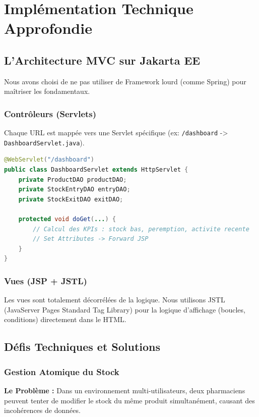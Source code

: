 \documentclass[12pt, a4paper]{report}
\begin{document}
\chapter{Implémentation Technique Approfondie}

\section{L'Architecture MVC sur Jakarta EE}
Nous avons choisi de ne pas utiliser de Framework lourd (comme Spring) pour maîtriser les fondamentaux.

\subsection{Contrôleurs (Servlets)}
Chaque URL est mappée vers une Servlet spécifique (ex: \texttt{/dashboard} -> \texttt{DashboardServlet.java}).
\begin{lstlisting}[language=Java, caption=Exemple de mappage Servlet]
@WebServlet("/dashboard")
public class DashboardServlet extends HttpServlet {
    private ProductDAO productDAO;
    private StockEntryDAO entryDAO;
    private StockExitDAO exitDAO;
    
    protected void doGet(...) {
        // Calcul des KPIs : stock bas, peremption, activite recente
        // Set Attributes -> Forward JSP
    }
}
\end{lstlisting}

\subsection{Vues (JSP + JSTL)}
Les vues sont totalement décorrélées de la logique. Nous utilisons JSTL (JavaServer Pages Standard Tag Library) pour la logique d'affichage (boucles, conditions) directement dans le HTML.

\section{Défis Techniques et Solutions}

\subsection{Gestion Atomique du Stock}
\begin{infobox}
\textbf{Le Problème :} Dans un environnement multi-utilisateurs, deux pharmaciens peuvent tenter de modifier le stock du même produit simultanément, causant des incohérences de données.
\end{infobox}
\end{document}
